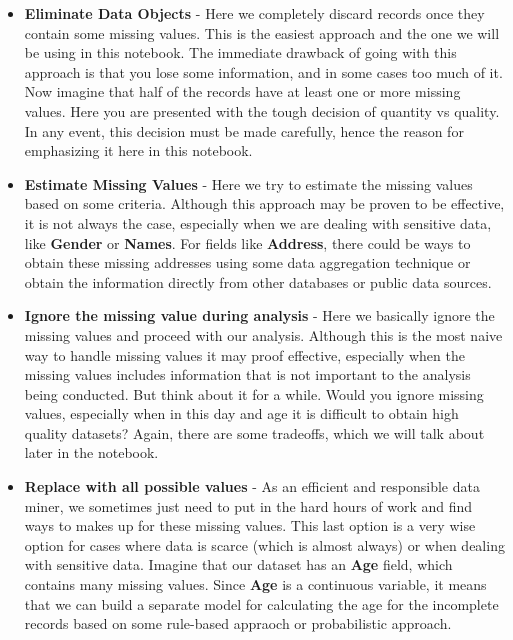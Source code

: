 \documentclass[11pt]{article}
\begin{document}
\begin{itemize}
\item
  \textbf{Eliminate Data Objects} - Here we completely discard records
  once they contain some missing values. This is the easiest approach
  and the one we will be using in this notebook. The immediate drawback
  of going with this approach is that you lose some information, and in
  some cases too much of it. Now imagine that half of the records have
  at least one or more missing values. Here you are presented with the
  tough decision of quantity vs quality. In any event, this decision
  must be made carefully, hence the reason for emphasizing it here in
  this notebook.
\item
  \textbf{Estimate Missing Values} - Here we try to estimate the missing
  values based on some criteria. Although this approach may be proven to
  be effective, it is not always the case, especially when we are
  dealing with sensitive data, like \textbf{Gender} or \textbf{Names}.
  For fields like \textbf{Address}, there could be ways to obtain these
  missing addresses using some data aggregation technique or obtain the
  information directly from other databases or public data sources.
\item
  \textbf{Ignore the missing value during analysis} - Here we basically
  ignore the missing values and proceed with our analysis. Although this
  is the most naive way to handle missing values it may proof effective,
  especially when the missing values includes information that is not
  important to the analysis being conducted. But think about it for a
  while. Would you ignore missing values, especially when in this day
  and age it is difficult to obtain high quality datasets? Again, there
  are some tradeoffs, which we will talk about later in the notebook.
\item
  \textbf{Replace with all possible values} - As an efficient and
  responsible data miner, we sometimes just need to put in the hard
  hours of work and find ways to makes up for these missing values. This
  last option is a very wise option for cases where data is scarce
  (which is almost always) or when dealing with sensitive data. Imagine
  that our dataset has an \textbf{Age} field, which contains many
  missing values. Since \textbf{Age} is a continuous variable, it means
  that we can build a separate model for calculating the age for the
  incomplete records based on some rule-based appraoch or probabilistic
  approach.
\end{itemize}
\end{document}
